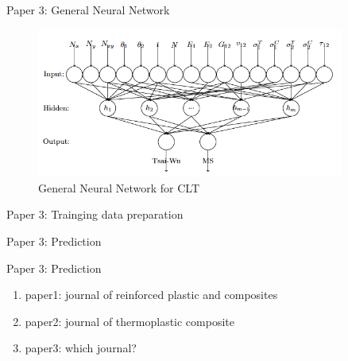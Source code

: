 \documentclass{beamer}
\begin{document}
\begin{frame}{Paper 3: General Neural Network}
	\begin{figure}
		\includegraphics[width=0.9\textwidth]{fig/a0_figure_ann_for_clt_architecture.png}
		\caption{General Neural Network for CLT}
	\end{figure}
\end{frame}

\begin{frame}{Paper 3: Trainging data preparation}
	
\end{frame}

\begin{frame}{Paper 3: Prediction}
	
\end{frame}

\begin{frame}{Paper 3: Prediction}
	\begin{enumerate}[1)]
		\item paper1:  journal of reinforced plastic and composites
		\item paper2:  journal of thermoplastic composite
		\item paper3: which journal?
	\end{enumerate}
\end{frame}
\end{document}

